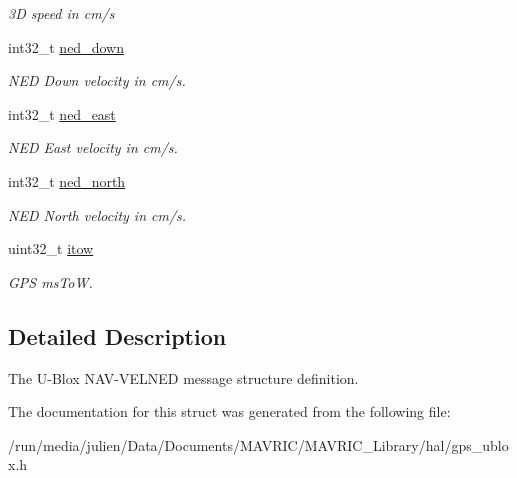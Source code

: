 \begin{DoxyCompactItemize}
\begin{DoxyCompactList}\small\item\em 3\+D speed in cm/s \end{DoxyCompactList}\item 
\hypertarget{structubx__nav__vel__ned__t_a27ce6c6619f52481c6c077f8ce867a54}{int32\+\_\+t \hyperlink{structubx__nav__vel__ned__t_a27ce6c6619f52481c6c077f8ce867a54}{ned\+\_\+down}}\label{structubx__nav__vel__ned__t_a27ce6c6619f52481c6c077f8ce867a54}

\begin{DoxyCompactList}\small\item\em N\+E\+D Down velocity in cm/s. \end{DoxyCompactList}\item 
\hypertarget{structubx__nav__vel__ned__t_a6c54c1e5225d01271a3ab70904c88bd2}{int32\+\_\+t \hyperlink{structubx__nav__vel__ned__t_a6c54c1e5225d01271a3ab70904c88bd2}{ned\+\_\+east}}\label{structubx__nav__vel__ned__t_a6c54c1e5225d01271a3ab70904c88bd2}

\begin{DoxyCompactList}\small\item\em N\+E\+D East velocity in cm/s. \end{DoxyCompactList}\item 
\hypertarget{structubx__nav__vel__ned__t_afcde6e146bc19f7e6876b54e71843722}{int32\+\_\+t \hyperlink{structubx__nav__vel__ned__t_afcde6e146bc19f7e6876b54e71843722}{ned\+\_\+north}}\label{structubx__nav__vel__ned__t_afcde6e146bc19f7e6876b54e71843722}

\begin{DoxyCompactList}\small\item\em N\+E\+D North velocity in cm/s. \end{DoxyCompactList}\item 
\hypertarget{structubx__nav__vel__ned__t_acd66ba7feeedb37272e2c43338a980f4}{uint32\+\_\+t \hyperlink{structubx__nav__vel__ned__t_acd66ba7feeedb37272e2c43338a980f4}{itow}}\label{structubx__nav__vel__ned__t_acd66ba7feeedb37272e2c43338a980f4}

\begin{DoxyCompactList}\small\item\em G\+P\+S ms\+To\+W. \end{DoxyCompactList}\end{DoxyCompactItemize}


\subsection{Detailed Description}
The U-\/\+Blox N\+A\+V-\/\+V\+E\+L\+N\+E\+D message structure definition. 

The documentation for this struct was generated from the following file\+:\begin{DoxyCompactItemize}
\item 
/run/media/julien/\+Data/\+Documents/\+M\+A\+V\+R\+I\+C/\+M\+A\+V\+R\+I\+C\+\_\+\+Library/hal/gps\+\_\+ublox.\+h\end{DoxyCompactItemize}

